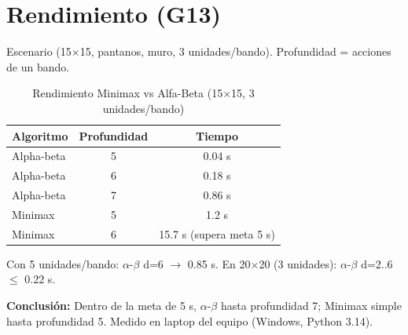 \section{Rendimiento (G13)}
\label{sec:rendimiento-detalle}

Escenario  (15$\times$15, pantanos, muro, 3 unidades/bando).
Profundidad = acciones de un bando.

\begin{table}[H]
\centering
\caption{Rendimiento Minimax vs Alfa-Beta (15$\times$15, 3 unidades/bando)}
\begin{tabular}{lcc}
\toprule
Algoritmo & Profundidad & Tiempo \\
\midrule
Alpha-beta & 5 & 0.04 s \\
Alpha-beta & 6 & 0.18 s \\
Alpha-beta & 7 & 0.86 s \\
Minimax & 5 & 1.2 s \\
Minimax & 6 & 15.7 s (supera meta 5 s) \\
\bottomrule
\end{tabular}
\end{table}
\label{tab:rendimiento-15x15}


Con 5 unidades/bando: $\alpha$-$\beta$ d=6 $\to$ 0.85 s. En 20$\times$20 (3 unidades):
$\alpha$-$\beta$ d=2..6 $\le$ 0.22 s.

\textbf{Conclusión:} Dentro de la meta de 5 s, $\alpha$-$\beta$ hasta profundidad 7; Minimax
simple hasta profundidad 5. Medido en laptop del equipo (Windows, Python 3.14).
